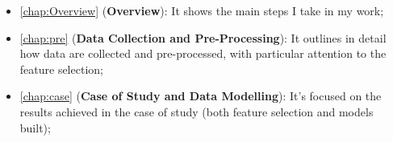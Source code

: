 \begin{itemize}
  \item \autoref{chap:Overview} (\textbf{Overview}): It shows the main steps I take in my work;
  \item \autoref{chap:pre} (\textbf{Data Collection and Pre-Processing}): It outlines in detail how data are collected and pre-processed, with particular attention to the feature selection;
  \item \autoref{chap:case} (\textbf{Case of Study and Data Modelling}): It's focused on the results achieved in the case of study (both feature selection and models built);
\end{itemize}
\begin{comment}
Indeed, in recent years ensemble feature selection are being implemented by researchers  
approaches are being developed by researchers. They follow a similar recipe with the well-established ensemble on classification algorithms, which provides better results and robustness than employing single algorithms
\end{comment}



